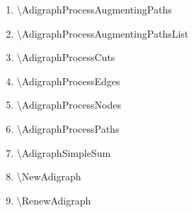 \documentclass{report}
\begin{document}
\begin{multicols}{2}
\begin{enumerate}
		\item \textbackslash AdigraphProcessAugmentingPaths
		\item \textbackslash AdigraphProcessAugmentingPathsList
		\item \textbackslash AdigraphProcessCuts
		\item \textbackslash AdigraphProcessEdges
		\item \textbackslash AdigraphProcessNodes
		\item \textbackslash AdigraphProcessPaths
		\item \textbackslash AdigraphSimpleSum
		\item \textbackslash NewAdigraph
		\item \textbackslash RenewAdigraph
	\end{enumerate}
\end{multicols}
\end{document}
